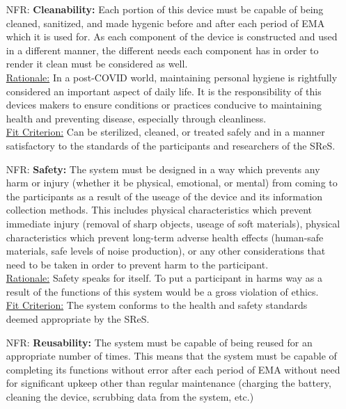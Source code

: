\documentclass[12pt]{article}
\newcounter{nfrnum} %
\begin{document}
\begin{itemize}
\item[NFR\refstepcounter{nfrnum}\thenfrnum \label{NFR_Cleanabiity}:]
  \textbf{Cleanability:} Each portion of this device must be capable of being cleaned, sanitized, and made hygenic before and after each period of EMA which it is used for. As each component of the device is constructed and used in a different manner, the different needs each component has in order to render it clean must be considered as well.\\

\underline{Rationale:} In a post-COVID world, maintaining personal hygiene is rightfully considered an important aspect of daily life. It is the responsibility of this devices makers to ensure conditions or practices conducive to maintaining health and preventing disease, especially through cleanliness.\\

\underline{Fit Criterion:} Can be sterilized, cleaned, or treated safely and in a manner satisfactory to the standards of the participants and researchers of the SReS.\\

\item[NFR\refstepcounter{nfrnum}\thenfrnum \label{NFR_Safety}:]
  \textbf{Safety:} The system must be designed in a way which prevents any harm or injury (whether it be physical, emotional, or mental) from coming to the participants as a result of the useage of the device and its information collection methods. This includes physical characteristics which prevent immediate injury (removal of sharp objects, useage of soft materials), physical characteristics which prevent long-term adverse health effects (human-safe materials, safe levels of noise production), or any other considerations that need to be taken in order to prevent harm to the participant.\\

\underline{Rationale:} Safety speaks for itself. To put a participant in harms way as a result of the functions of this system would be a gross violation of ethics.\\

\underline{Fit Criterion:} The system conforms to the health and safety standards deemed appropriate by the SReS.\\

\item[NFR\refstepcounter{nfrnum}\thenfrnum \label{NFR_Reusability}:]
  \textbf{Reusability:} The system must be capable of being reused for an appropriate number of times. This means that the system must be capable of completing its functions without error after each period of EMA without need for significant upkeep other than regular maintenance (charging the battery, cleaning the device, scrubbing data from the system, etc.)\\


\end{itemize}
\end{document}

